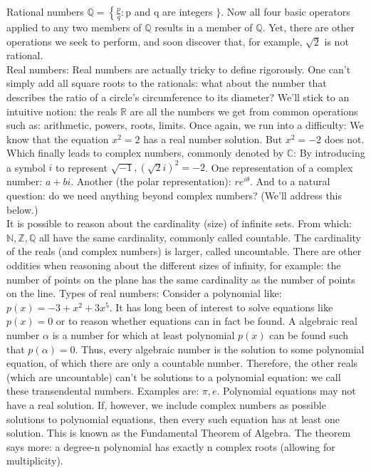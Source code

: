 \documentclass[main.tex]{subfiles}
\begin{document}
Rational numbers $\mathbb{Q}=\left\{\frac{p}{q}: \mathrm{p}\right.$ and $\mathrm{q}$ are integers $\}$. Now all four basic operators applied to any two members of $\mathbb{Q}$ results in a member of $\mathbb{Q}$. Yet, there are other operations we seek to perform, and soon discover that, for example, $\sqrt{2}$ is not rational.\\

Real numbers: Real numbers are actually tricky to define rigorously. One can't simply add all square roots to the rationals: what about the number that describes the ratio of a circle's circumference to its diameter? We'll stick to an intuitive notion: the reals $\mathbb{R}$ are all the numbers we get from common operations such as: arithmetic, powers, roots, limits. Once again, we run into a difficulty: We know that the equation $x^{2}=2$ has a real number solution. But $x^{2}=-2$ does not.\\

Which finally leads to complex numbers, commonly denoted by $\mathbb{C}$: By introducing a symbol $i$ to represent $\sqrt{-1},(\sqrt{2} i)^{2}=-2$. One representation of a complex number: $a+b i$. Another (the polar representation): $r e^{i \theta}$. And to a natural question: do we need anything beyond complex numbers? (We'll address this below.)\\

It is possible to reason about the cardinality (size) of infinite sets. From which: $\mathbb{N}, \mathbb{Z}, \mathbb{Q}$ all have the same cardinality, commonly called countable. The cardinality of the reals (and complex numbers) is larger, called uncountable. There are other oddities when reasoning about the different sizes of infinity, for example: the number of points on the plane has the same cardinality as the number of points on the line. Types of real numbers: Consider a polynomial like: $p(x)=-3+x^{2}+3 x^{5}$. It has long been of interest to solve equations like $p(x)=0$ or to reason whether equations can in fact be found. A algebraic real number $\alpha$ is a number for which at least polynomial $p(x)$ can be found such that $p(\alpha)=0$. Thus, every algebraic number is the solution to some polynomial equation, of which there are only a countable number. Therefore, the other reals (which are uncountable) can't be solutions to a polynomial equation: we call these transendental numbers. Examples are: $\pi, e$. Polynomial equations may not have a real solution. If, however, we include complex numbers as possible solutions to polynomial equations, then every such equation has at least one solution. This is known as the Fundamental Theorem of Algebra. The theorem says more: a degree-n polynomial has exactly n complex roots (allowing for multiplicity).\\
\end{document}
